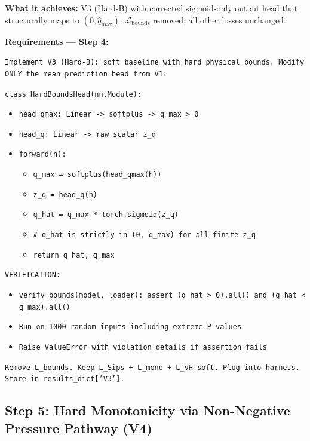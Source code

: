 \documentclass[12pt,a4paper]{article}
\begin{document}
\begin{stepbox}
\textbf{What it achieves:} V3 (Hard-B) with corrected sigmoid-only output
head that structurally maps to $(0, \hat{q}_{\max})$.
$\mathcal{L}_{\text{bounds}}$ removed; all other losses unchanged.
\end{stepbox}

\begin{promptbox}
\textbf{Requirements --- Step 4:}

\texttt{Implement V3 (Hard-B): soft baseline with hard physical bounds.
Modify ONLY the mean prediction head from V1:}

\texttt{class HardBoundsHead(nn.Module):}
\begin{itemize}[noitemsep]
  \item \texttt{head\_qmax: Linear -> softplus -> q\_max > 0}
  \item \texttt{head\_q: Linear -> raw scalar z\_q}
  \item \texttt{forward(h):}
  \begin{itemize}[noitemsep]
    \item \texttt{q\_max = softplus(head\_qmax(h))}
    \item \texttt{z\_q = head\_q(h)}
    \item \texttt{q\_hat = q\_max * torch.sigmoid(z\_q)}
    \item \texttt{\# q\_hat is strictly in (0, q\_max) for all finite z\_q}
    \item \texttt{return q\_hat, q\_max}
  \end{itemize}
\end{itemize}

\texttt{VERIFICATION:}
\begin{itemize}[noitemsep]
  \item \texttt{verify\_bounds(model, loader): assert (q\_hat > 0).all()
    and (q\_hat < q\_max).all()}
  \item \texttt{Run on 1000 random inputs including extreme P values}
  \item \texttt{Raise ValueError with violation details if assertion fails}
\end{itemize}

\texttt{Remove L\_bounds. Keep L\_Sips + L\_mono + L\_vH soft.
Plug into harness. Store in results\_dict['V3'].}
\end{promptbox}

\subsection{Step 5: Hard Monotonicity via Non-Negative Pressure Pathway (V4)}
\end{document}
